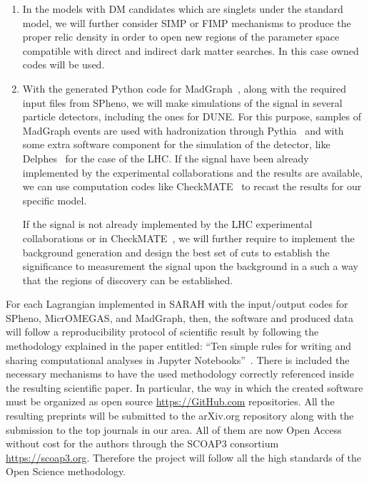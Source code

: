 \documentclass[a4paper,10pt,epsfig,epsf,amsfonts,amsmath]{article}
\begin{document}
\begin{enumerate}
\item In the models with DM candidates which are singlets under the standard
  model, we will further consider SIMP or FIMP mechanisms to produce
  the proper relic density in order to open new regions of the
  parameter space compatible with direct and indirect dark matter
  searches. In this case owned codes will be used.

\item With the generated Python code for
  MadGraph~\cite{Alwall:2011uj}, along with the required input files
  from SPheno, we will make simulations of the signal in several
  particle detectors, including the ones for DUNE. For this purpose,
  samples of MadGraph events are used with hadronization through
  Pythia~\cite{Sjostrand:2014zea} and with some extra software component for the
  simulation of the detector, like Delphes~\cite{deFavereau:2013fsa} for the case of the
  LHC.
  If the signal have been already implemented by the experimental
  collaborations and the results are available, we can use computation
  codes like CheckMATE~\cite{Drees:2013wra} to recast the results for
  our specific model.

  If the signal is not already implemented by the LHC experimental
  collaborations or in CheckMATE~\cite{Drees:2013wra}, we will further
  require to implement the background generation and design the best
  set of cuts to establish the significance to measurement the signal
  upon the background in a such a way that the regions of discovery
  can be established.


\end{enumerate}

For each Lagrangian implemented in SARAH with the input/output codes
for SPheno, MicrOMEGAS, and MadGraph, then, the software and produced
data will follow a reproducibility protocol of scientific result by
following the methodology explained in the paper entitled: ``Ten
simple rules for writing and sharing computational analyses in Jupyter
Notebooks''~\cite{Rule2019}.  There is included the necessary
mechanisms to have the used methodology correctly referenced inside
the resulting scientific paper. In particular, the way in which the
created software must be organized as open source \url{https://GitHub.com} repositories.
All the resulting preprints will be submitted to the arXiv.org repository along with the submission to
the top journals in our area. All of them  are now Open Access without cost for the authors through the
SCOAP3 consortium \url{https://scoap3.org}. 
Therefore  the project  will follow all the high 
standards of the Open Science methodology.
\end{document}
